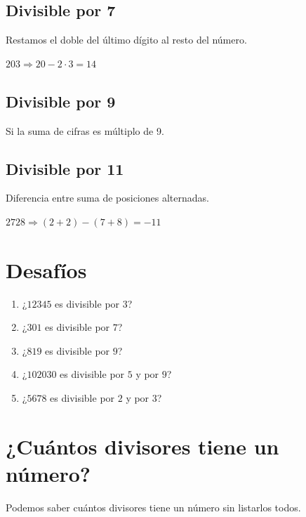 \documentclass[12pt]{article}
\begin{document}
    \subsection*{Divisible por 7}
    Restamos el doble del último dígito al resto del número.

    \begin{ejemplo}
        $203 \Rightarrow 20 - 2\cdot3 = 14$
    \end{ejemplo}

    \subsection*{Divisible por 9}
    Si la suma de cifras es múltiplo de 9.

    \subsection*{Divisible por 11}
    Diferencia entre suma de posiciones alternadas.

    \begin{ejemplo}
        $2728 \Rightarrow (2+2)-(7+8)=-11$
    \end{ejemplo}

    \section{Desafíos}
    \begin{desafio}
        \begin{enumerate}
            \item ¿$12345$ es divisible por $3$?
            \item ¿$301$ es divisible por $7$?
            \item ¿$819$ es divisible por $9$?
            \item ¿$102030$ es divisible por $5$ y por $9$?
            \item ¿$5678$ es divisible por $2$ y por $3$?
        \end{enumerate}
    \end{desafio}

    \newpage
    \section{¿Cuántos divisores tiene un número?}
    \begin{idea}
        Podemos saber cuántos divisores tiene un número sin listarlos todos.
    \end{idea}
\end{document}
